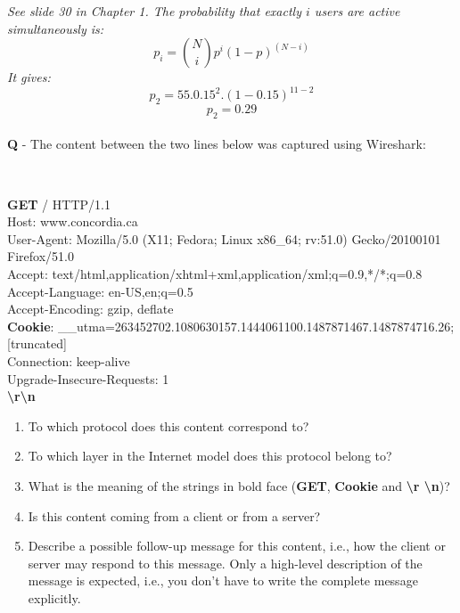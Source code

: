 \documentclass{llncs}
\newcounter{ques}
\renewcommand{\question}[1]{\paragraph{}\textbf{Q\theques} - #1\stepcounter{ques} }
\newcommand{\answer}[1]{\color{red}\textit{#1}\color{black}}
\begin{document}
\answer{See slide 30 in Chapter 1.
  The probability that exactly $i$ users are active simultaneously is:
  \begin{equation*}
    p_i = \binom{N}{i} p^i(1-p)^{(N-i)}
  \end{equation*}
  It gives:
  \begin{equation*}
    p_2 = 55.0.15^2.(1-0.15)^{11-2}
  \end{equation*}
  \begin{equation*}
    p_2 = 0.29
  \end{equation*}
}

\newpage




\question{The content between the two lines below was captured using
  Wireshark:
  
\noindent \hrulefill\\
\begin{small}
\textbf{GET} / HTTP/1.1 \\
Host: www.concordia.ca\\
User-Agent: Mozilla/5.0 (X11; Fedora; Linux x86\_64; rv:51.0) Gecko/20100101 Firefox/51.0\\
Accept: text/html,application/xhtml+xml,application/xml;q=0.9,*/*;q=0.8\\
Accept-Language: en-US,en;q=0.5\\
Accept-Encoding: gzip, deflate\\
\textbf{Cookie}: \_\_utma=263452702.1080630157.1444061100.1487871467.1487874716.26;  [truncated]\\
Connection: keep-alive\\
Upgrade-Insecure-Requests: 1\\
\textbf{\textbackslash r\textbackslash n}\\
\vspace*{-0.3cm}
\hrulefill

\end{small}
\begin{enumerate}
\item To which protocol does this content correspond to?
\item To which layer in the Internet model does this protocol belong to?
\item What is the meaning of the strings in bold face (\textbf{GET}, \textbf{Cookie} and \textbf{\textbackslash r \textbackslash n})? 
\item Is this content coming from a client or from a server?
\item Describe a possible follow-up message for this content, i.e.,
  how the client or server may respond to this message. Only a
  high-level description of the message is expected, i.e., you don't
  have to write the complete message explicitly.
\end{enumerate}
}
\end{document}
